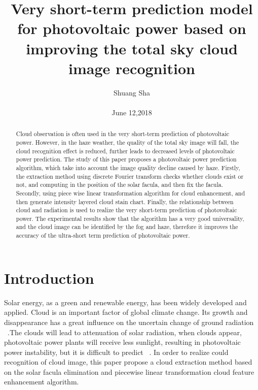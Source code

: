 \documentclass[10pt,twocolumn,letterpaper]{article}
\begin{document}
\title{Very short-term prediction model for photovoltaic power based on improving the total sky cloud image recognition}

\author{Shuang Sha \\\\ June 12,2018}

\maketitle

\begin{abstract}
  Cloud observation is often used in the very short-term prediction of photovoltaic power. However, in the haze weather, the quality of the total sky image will fall, the cloud recognition effect is reduced, further leads to decreased levels of photovoltaic power prediction. The study of this paper proposes a photovoltaic power prediction algorithm, which take into account the image quality decline caused by haze. Firstly, the extraction method using discrete Fourier transform checks whether clouds exist or not, and computing in the position of the solar facula, and then fix the facula. Secondly, using piece wise linear transformation algorithm for cloud enhancement, and then generate intensity layered cloud stain chart. Finally, the relationship between cloud and radiation is used to realize the very short-term prediction of photovoltaic power. The experimental results show that the algorithm has a very good universality, and the cloud image can be identified by the fog and haze, therefore it improves the accuracy of the ultra-short term prediction of photovoltaic power.
\end{abstract}

\section{Introduction}

Solar energy, as a green and renewable energy, has been widely developed and applied. Cloud is an important factor of global climate change. Its growth and disappearance has a great influence on the uncertain change of ground radiation ~\cite{Yang2013Application}.The clouds will lead to attenuation of solar radiation, when clouds appear, photovoltaic power plants will receive less sunlight, resulting in photovoltaic power instability, but it is difficult to predict ~\cite{xiang2015very}.
In order to realize could recognition of cloud image, this paper propose a cloud extraction method based on the solar facula elimination and piecewise linear transformation cloud feature enhancement algorithm.
\end{document}
